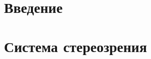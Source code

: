 \documentclass[a4paper,14pt]{extarticle} %
\begin{document}



\tableofcontents %
\clearpage

\section{Введение}





\section{Система стереозрения}







\end{document}
